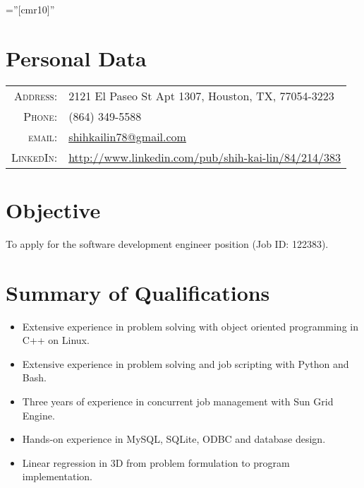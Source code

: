 \documentclass[11pt]{article} %
\begin{document}
\pagestyle{empty} %

\font\fb=''[cmr10]'' %


\par{\bigskip\par} %

\section{Personal Data}

\begin{tabular}{rl}
\textsc{Address:} & 2121 El Paseo St Apt 1307, Houston, TX, 77054-3223 \\
\textsc{Phone:} & (864) 349-5588 \\
\textsc{email:} & \href{mailto:shihkailin78@gmail.com}{shihkailin78@gmail.com} \\
\textsc{LinkedIn:} & \href{http://www.linkedin.com/pub/shih-kai-lin/84/214/383}{http://www.linkedin.com/pub/shih-kai-lin/84/214/383}
\end{tabular}


\section{Objective}
To apply for the software development engineer position (Job ID: 122383).



\section{Summary of Qualifications}
\begin{itemize}
  \item Extensive experience in problem solving with object oriented programming in C++ on Linux.
  \item Extensive experience in problem solving and job scripting with Python and Bash.
  \item Three years of experience in concurrent job management with Sun Grid Engine.
  \item Hands-on experience in MySQL, SQLite, ODBC and database design.
  \item Linear regression in 3D from problem formulation to program implementation.
\end{itemize}
\end{document}
